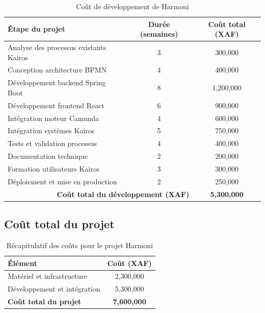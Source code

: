 \begin{table}[H]
    \centering
    \begin{tabular}{|l|c|c|}
        \hline
        \textbf{Étape du projet} & \textbf{Durée (semaines)} & \textbf{Coût total (XAF)} \\
        \hline
        Analyse des processus existants Kairos & 3 & 300,000 \\
        \hline
        Conception architecture BPMN & 4 & 400,000 \\
        \hline
        Développement backend Spring Boot & 8 & 1,200,000 \\
        \hline
        Développement frontend React & 6 & 900,000 \\
        \hline
        Intégration moteur Camunda & 4 & 600,000 \\
        \hline
        Intégration systèmes Kairos & 5 & 750,000 \\
        \hline
        Tests et validation processus & 4 & 400,000 \\
        \hline
        Documentation technique & 2 & 200,000 \\
        \hline
        Formation utilisateurs Kairos & 3 & 300,000 \\
        \hline
        Déploiement et mise en production & 2 & 250,000 \\
        \hline
        \multicolumn{2}{|r|}{\textbf{Coût total du développement (XAF)}} & \textbf{5,300,000} \\
        \hline
    \end{tabular}
    \caption{Coût de développement de Harmoni}
    \label{tab:cout_developpement}
\end{table}

\subsection{Coût total du projet}

\begin{table}[H]
    \centering
    \begin{tabular}{|l|c|}
        \hline
        \textbf{Élément} & \textbf{Coût (XAF)} \\
        \hline
        Matériel et infrastructure & 2,300,000 \\
        \hline
        Développement et intégration & 5,300,000 \\
        \hline
        \textbf{Coût total du projet} & \textbf{7,600,000} \\
        \hline
    \end{tabular}
    \caption{Récapitulatif des coûts pour le projet Harmoni}
    \label{tab:cout_total}
\end{table}

